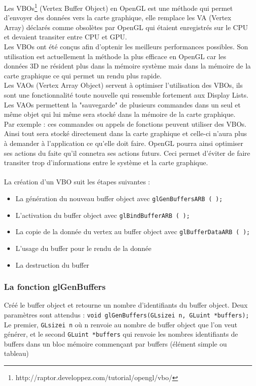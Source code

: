 
Les VBOs\footnote{http://raptor.developpez.com/tutorial/opengl/vbo/} (Vertex Buffer Object) en OpenGL est une méthode qui permet d'envoyer des données vers la carte graphique, elle remplace les VA (Vertex Array) déclarés comme obsolètes par OpenGL qui étaient enregistrés sur le CPU et devaient transiter entre CPU et GPU.\\
Les VBOs ont été conçus afin d'optenir les meilleurs performances possibles. Son utilisation est actuellement la méthode la plus efficace en OpenGL car les données 3D ne résident plus dans la mémoire système mais dans la mémoire de la carte graphique ce qui permet un rendu plus rapide.\\
Les VAOs (Vertex Array Object) servent à optimiser l'utilisation des VBOs, ils sont une fonctionnalité toute nouvelle qui ressemble fortement aux Display Lists. Les VAOs permettent la "sauvegarde" de plusieurs commandes dans un seul et même objet qui lui même sera stocké dans la mémoire de la carte graphique. \\
Par exemple : ces commandes ou appels de fonctions peuvent utiliser des VBOs. Ainsi tout sera stocké directement dans la carte graphique et celle-ci n'aura plus à demander à l'application ce qu'elle doit faire. OpenGL pourra ainsi optimiser ses actions du faite qu'il connetra ses actions futurs. Ceci permet d'éviter de faire transiter trop d'informations entre le système et la carte graphique.\\\\
La création d’un VBO suit les étapes suivantes : 
\begin{itemize}
\item La génération du nouveau buffer object avec \verb|glGenBuffersARB ( );|
\item L’activation du buffer object avec \verb|glBindBufferARB ( );|
\item La copie de la donnée du vertex au buffer object avec \verb|glBufferDataARB ( );| 
\item L’usage du buffer pour le rendu de la donnée
\item La destruction du buffer
\end{itemize}
\subsubsection*{La fonction glGenBuffers} 
Créé le buffer object et retourne un nombre d’identifiants du buffer object. Deux paramètres sont attendus : 
\verb|void glGenBuffers(GLsizei n, GLuint *buffers);|
\\
Le premier, \verb|GLsizei n| où n renvoie au nombre de buffer object que l’on veut générer, et le second \verb|GLuint *buffers| qui renvoie les nombres identifiants de buffers dans un bloc mémoire commençant par buffers (élément simple ou tableau)

